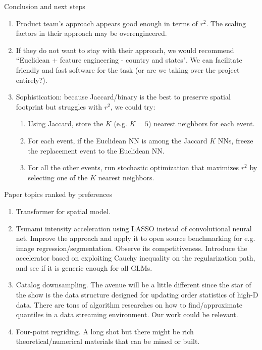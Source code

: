 \documentclass[aspectratio=169]{beamer}
\begin{document}
\begin{frame}{Conclusion and next steps}

\begin{enumerate}
\item Product team's approach appears good enough in terms of $r^2$. The scaling factors in their approach may be overengineered.\medskip\pause

\item If they do not want to stay with their approach, we would recommend ``Euclidean + feature engineering - country and states". We can facilitate friendly and fast software for the task (or are we taking over the project entirely?).\medskip\pause

\item Sophistication: because Jaccard/binary is the best to preserve spatial footprint but struggles with $r^2$, we could try:\medskip
\begin{enumerate}

\item Using Jaccard, store the $K$ (e.g. $K=5$) nearest neighbors for each event.\medskip\pause

\item For each event, if the Euclidean NN is among the Jaccard $K$ NNs, freeze the replacement event to the Euclidean NN.\medskip

\item For all the other events, run stochastic optimization that maximizes $r^2$ by selecting one of the $K$ nearest neighbors.
\end{enumerate}

\end{enumerate}
\end{frame}

\begin{frame}{Paper topics ranked by preferences}
\begin{enumerate}
\item Transformer for spatial model.\medskip\pause

\item Tsunami intensity acceleration using LASSO instead of convolutional neural net. Improve the approach and apply it to open source benchmarking for e.g. image regression/segmentation. Observe its competitiveness. Introduce the accelerator based on exploiting Cauchy inequality on the regularization path, and see if it is generic enough for all GLMs.\medskip\pause

\item Catalog downsampling. The avenue will be a little different since the star of the show is the data structure designed for updating order statistics of high-D data. There are tons of algorithm researches on how to find/approximate quantiles in a data streaming environment. Our work could be relevant.\medskip\pause

\item Four-point regriding. A long shot but there might be rich theoretical/numerical materials that can be mined or built. 
\end{enumerate}
\end{frame}



\end{document}
